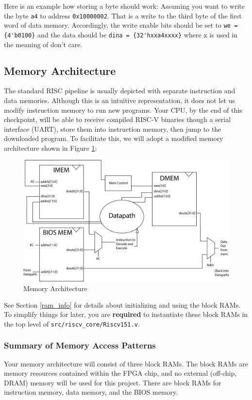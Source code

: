 \documentclass[11pt]{article}
\begin{document}
Here is an example how storing a byte should work: Assuming you want to write the byte \verb|a4| to address \verb|0x10000002|. That is a write to the third byte of the first word of data memory. Accordingly, the write enable bits should be set to \verb|we = {4'b0100}| and the data should be \verb|dina = {32'hxxa4xxxx}| where x is used in the meaning of don’t care.

\subsection{Memory Architecture}
The standard RISC pipeline is usually depicted with separate instruction and data memories. Although this is an intuitive representation, it does not let us modify instruction memory to run new programs. Your CPU, by the end of this checkpoint, will be able to receive compiled RISC-V binaries though a serial interface (UART), store them into instruction memory, then jump to the downloaded program. To facilitate this, we will adopt a modified memory architecture shown in Figure \ref{fig:mem_arch}:

\begin{figure}[hbt]
	\begin{center}
		\includegraphics[width=6in]{RISCMemoryArchitectureBigMemLarge}
		\caption{Memory Architecture}
		\label{fig:mem_arch}
	\end{center}
\end{figure}

See Section \ref{ram_info} for details about initializing and using the block RAMs. To simplify things for later, you are \textbf{required} to instantiate these block RAMs in the top level of \verb|src/riscv_core/Riscv151.v|.

\subsubsection{Summary of Memory Access Patterns}
Your memory architecture will consist of three block RAMs. The block RAMs are memory resources contained within the FPGA chip, and no external (off-chip, DRAM) memory will be used for this project. There are block RAMs for instruction memory, data memory, and the BIOS memory. 
\end{document}
